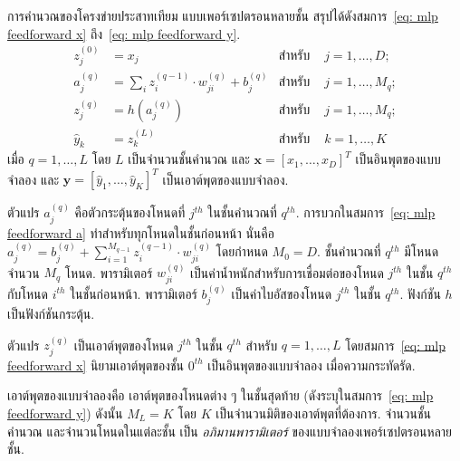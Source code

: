 การคำนวณของโครงข่ายประสาทเทียม
แบบเพอร์เซปตรอนหลายชั้น สรุปได้ดังสมการ~\ref{eq: mlp feedforward x} ถึง~\ref{eq: mlp feedforward y}.
\begin{align}
z_j^{(0)} &= x_j &\mbox{สำหรับ }& j = 1, \ldots, D;
\label{eq: mlp feedforward x} \\ 
a_j^{(q)} &= \sum_i z_i^{(q-1)} \cdot w_{ji}^{(q)} + b_j^{(q)}
&\mbox{สำหรับ }& j = 1, \ldots, M_q;
\label{eq: mlp feedforward a} \\
z_j^{(q)} &= h(a_j^{(q)}) 
&\mbox{สำหรับ }& j = 1, \ldots, M_q;
\label{eq: mlp feedforward z} \\
\hat{y}_k &= z_k^{(L)}
&\mbox{สำหรับ }& k = 1, \ldots, K
\label{eq: mlp feedforward y} 
\end{align}
เมื่อ $q = 1, \ldots, L$ โดย $L$ เป็นจำนวนชั้นคำนวณ
และ
$\bm{x} = [x_1, \ldots, x_D]^T$ เป็นอินพุตของแบบจำลอง
และ $\bm{\hat{y}} = [\hat{y}_1, \ldots, \hat{y}_K]^T$ เป็นเอาต์พุตของแบบจำลอง.

ตัวแปร $a_j^{(q)}$ คือตัวกระตุ้นของโหนดที่ $j^{th}$ ในชั้นคำนวณที่ $q^{th}$.
การบวกในสมการ~\ref{eq: mlp feedforward a}
ทำสำหรับทุกโหนดในชั้นก่อนหน้า 
นั่นคือ $a_j^{(q)} = b_j^{(q)} + \sum_{i=1}^{M_{q-1}} z_i^{(q-1)} \cdot w_{ji}^{(q)}$
โดยกำหนด $M_0 = D$.
ชั้นคำนวณที่ $q^{th}$
มีโหนด จำนวน $M_q$ โหนด.
พารามิเตอร์ $w_{ji}^{(q)}$
เป็นค่าน้ำหนักสำหรับการเชื่อมต่อของโหนด $j^{th}$ ในชั้น $q^{th}$
กับโหนด $i^{th}$ ในชั้นก่อนหน้า.
พารามิเตอร์ $b_j^{(q)}$
เป็นค่าไบอัสของโหนด $j^{th}$ ในชั้น $q^{th}$.
ฟังก์ชัน $h$ เป็นฟังก์ชันกระตุ้น.

ตัวแปร $z_j^{(q)}$ เป็นเอาต์พุตของโหนด $j^{th}$ ในชั้น $q^{th}$ สำหรับ $q = 1, \ldots, L$
โดยสมการ~\ref{eq: mlp feedforward x} นิยามเอาต์พุตของชั้น $0^{th}$ เป็นอินพุตของแบบจำลอง เมื่อความกระทัดรัด.

เอาต์พุตของแบบจำลองคือ
เอาต์พุตของโหนดต่าง ๆ ในชั้นสุดท้าย (ดังระบุในสมการ~\ref{eq: mlp feedforward y})
ดังนั้น $M_L = K$ โดย $K$ เป็นจำนวนมิติของเอาต์พุตที่ต้องการ.
จำนวนชั้นคำนวณ 
และจำนวนโหนดในแต่ละชั้น
เป็น
\textit{อภิมานพารามิเตอร์}
ของแบบจำลองเพอร์เซปตรอนหลายชั้น.

